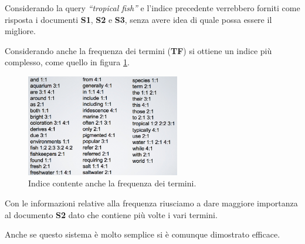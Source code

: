 \noindent Considerando la query \textit{``tropical fish''} e l'indice precedente verrebbero forniti come risposta i documenti \textbf{S1}, \textbf{S2} e \textbf{S3}, senza avere idea di quale possa essere il migliore.

Considerando anche la frequenza dei termini (\textbf{TF}) si ottiene un indice più complesso, come quello in figura \ref{fig:index-freq}.

\begin{figure}[htbp]
	\centering
	\includegraphics[width=0.6\textwidth]{./images/l6-index-2}
	\caption{Indice contente anche la frequenza dei termini.}\label{fig:index-freq}
\end{figure}

\noindent Con le informazioni relative alla frequenza riusciamo a dare maggiore importanza al documento \textbf{S2} dato che contiene più volte i vari termini.

Anche se questo sistema è molto semplice si è comunque dimostrato efficace.



